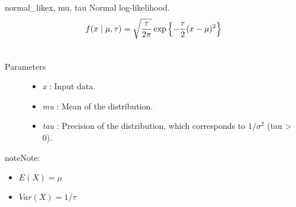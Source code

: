 \hypertarget{pymc.distributions.normal_like}{}\begin{funcdesc}{normal\_like}{x, mu, tau}
Normal log-likelihood.
\begin{gather}
\begin{split}f(x \mid \mu, \tau) = \sqrt{\frac{\tau}{2\pi}} \exp\left\{ -\frac{\tau}{2} (x-\mu)^2 \right\}\end{split}\notag\\\begin{split}\end{split}\notag
\end{gather}\begin{description}
\item[Parameters] \leavevmode\begin{itemize}
\item {} 
\emph{x} : Input data.

\item {} 
\emph{mu} : Mean of the distribution.

\item {} 
\emph{tau} : Precision of the distribution, which corresponds to $1/\sigma^2$ (tau \textgreater{} 0).

\end{itemize}

\end{description}

\begin{notice}{note}{Note:}\begin{itemize}
\item {} 
$E(X) = \mu$

\item {} 
$Var(X) = 1/\tau$

\end{itemize}
\end{notice}
\end{funcdesc}

